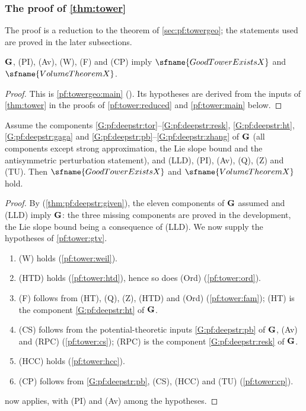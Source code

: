 \subsubsection*{The proof of \cref{thm:tower}}
The proof is a reduction to the theorem of \cref{sec:pf:towergeo}; the statements used are proved in the
later subsections.

\begin{theorem}\label{pf:tower:gtv}
$\mathbf G$, \textup{(PI)}, \textup{(Av)}, \textup{(W)}, \textup{(F)} and \textup{(CP)} imply
$\sfname{GoodTowerExistsX}$ and $\sfname{VolumeTheoremX}$.
\end{theorem}

\begin{proof}
This is \cref{pf:towergeo:main} (). Its
hypotheses are derived from the inputs of \cref{thm:tower} in the proofs of \cref{pf:tower:reduced} and
\cref{pf:tower:main} below.
\end{proof}

\begin{theorem}\label{pf:tower:reduced}
Assume the components \ref{G:pf:deepstr:tor}--\ref{G:pf:deepstr:resk}, \ref{G:pf:deepstr:ht},
\ref{G:pf:deepstr:gaga} and \ref{G:pf:deepstr:pb}--\ref{G:pf:deepstr:zhang} of $\mathbf G$ (all components
except strong approximation, the Lie slope bound and the antisymmetric perturbation statement), and
\textup{(LLD)}, \textup{(PI)}, \textup{(Av)}, \textup{(Q)}, \textup{(Z)} and \textup{(TU)}. Then
$\sfname{GoodTowerExistsX}$ and $\sfname{VolumeTheoremX}$ hold.
\end{theorem}

\begin{proof}
By  (\cref{thm:pf:deepstr:given}), the eleven
components of $\mathbf G$ assumed and (LLD) imply $\mathbf G$: the three missing components are proved in the
development, the Lie slope bound being a consequence of (LLD). We now supply the hypotheses of
\cref{pf:tower:gtv}.
\begin{enumerate}[label=(\alph*)]
\item (W) holds (\cref{pf:tower:weil}).
\item (HTD) holds (\cref{pf:tower:htd}), hence so does (Ord) (\cref{pf:tower:ord}).
\item (F) follows from (HT), (Q), (Z), (HTD) and (Ord) (\cref{pf:tower:fam}); (HT) is the component
  \ref{G:pf:deepstr:ht} of $\mathbf G$.
\item (CS) follows from the potential-theoretic inputs \ref{G:pf:deepstr:pb} of $\mathbf G$, (Av) and (RPC)
  (\cref{pf:tower:cs}); (RPC) is the component \ref{G:pf:deepstr:resk} of $\mathbf G$.
\item (HCC) holds (\cref{pf:tower:hcc}).
\item (CP) follows from \ref{G:pf:deepstr:pb}, (CS), (HCC) and (TU) (\cref{pf:tower:cp}).
\end{enumerate}
 now applies, with (PI) and (Av) among the hypotheses.
\end{proof}


